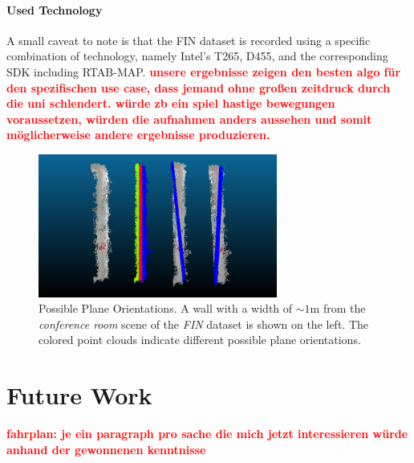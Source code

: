 \documentclass[main.tex]{subfiles}
\begin{document}
\paragraph{Used Technology}
A small caveat to note is that the FIN dataset is recorded using a specific combination of technology, namely Intel's T265, D455, and the corresponding SDK including RTAB-MAP.
\textbf{\textcolor{red}{unsere ergebnisse zeigen den besten algo für den spezifischen use case, dass jemand ohne großen zeitdruck durch die uni schlendert. würde zb ein spiel hastige bewegungen voraussetzen, würden die aufnahmen anders aussehen und somit möglicherweise andere ergebnisse produzieren.}}

\begin{figure}
    \centering
    \includegraphics[width=0.7\textwidth]{images/possible_planes.png}
    \caption[Possible Plane Orientations]{Possible Plane Orientations. A wall with a width of ${\sim}1$m from the \textit{conference room} scene of the \textit{FIN} dataset is shown on the left. The colored point clouds indicate different possible plane orientations.}
    \label{fig:poss-planes}
\end{figure}

\section{Future Work}
\textbf{\textcolor{red}{fahrplan: je ein paragraph pro sache die mich jetzt interessieren würde anhand der gewonnenen kenntnisse}}
\end{document}
